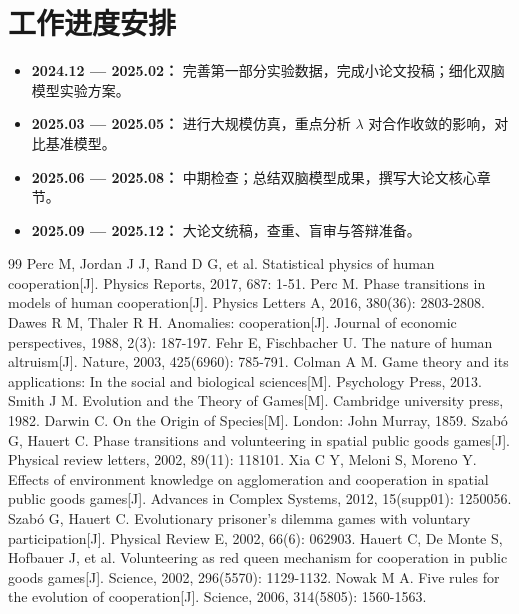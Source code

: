 \documentclass[UTF8,a4paper,12pt]{ctexart}
\begin{document}
\section{工作进度安排}
\begin{itemize}
    \item \textbf{2024.12 — 2025.02：} 完善第一部分实验数据，完成小论文投稿；细化双脑模型实验方案。
    \item \textbf{2025.03 — 2025.05：} 进行大规模仿真，重点分析 $\lambda$ 对合作收敛的影响，对比基准模型。
    \item \textbf{2025.06 — 2025.08：} 中期检查；总结双脑模型成果，撰写大论文核心章节。
    \item \textbf{2025.09 — 2025.12：} 大论文统稿，查重、盲审与答辩准备。
\end{itemize}

\begin{thebibliography}{99}
     Perc M, Jordan J J, Rand D G, et al. Statistical physics of human cooperation[J]. Physics Reports, 2017, 687: 1-51.
     Perc M. Phase transitions in models of human cooperation[J]. Physics Letters A, 2016, 380(36): 2803-2808.
     Dawes R M, Thaler R H. Anomalies: cooperation[J]. Journal of economic perspectives, 1988, 2(3): 187-197.
     Fehr E, Fischbacher U. The nature of human altruism[J]. Nature, 2003, 425(6960): 785-791.
     Colman A M. Game theory and its applications: In the social and biological sciences[M]. Psychology Press, 2013.
     Smith J M. Evolution and the Theory of Games[M]. Cambridge university press, 1982.
     Darwin C. On the Origin of Species[M]. London: John Murray, 1859.
     Szabó G, Hauert C. Phase transitions and volunteering in spatial public goods games[J]. Physical review letters, 2002, 89(11): 118101.
     Xia C Y, Meloni S, Moreno Y. Effects of environment knowledge on agglomeration and cooperation in spatial public goods games[J]. Advances in Complex Systems, 2012, 15(supp01): 1250056.
     Szabó G, Hauert C. Evolutionary prisoner’s dilemma games with voluntary participation[J]. Physical Review E, 2002, 66(6): 062903.
     Hauert C, De Monte S, Hofbauer J, et al. Volunteering as red queen mechanism for cooperation in public goods games[J]. Science, 2002, 296(5570): 1129-1132.
     Nowak M A. Five rules for the evolution of cooperation[J]. Science, 2006, 314(5805): 1560-1563.

\end{thebibliography}
\end{document}
